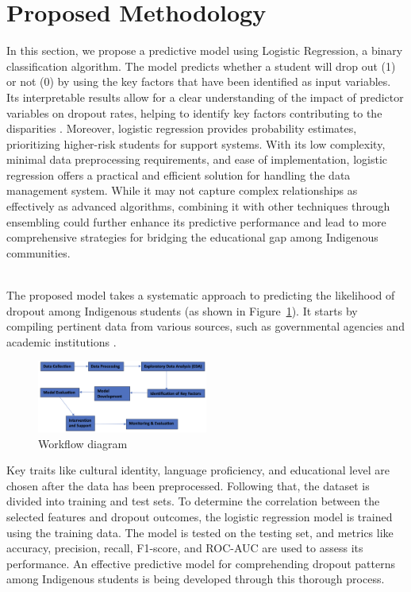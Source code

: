 \documentclass[final,12p,twocolumn]{article}
\begin{document}
\section{Proposed Methodology}
In this section, we propose a predictive model using Logistic Regression, a
binary classification algorithm. The model predicts whether a student will
drop out (1) or not (0) by using the key factors that have been identified
as input variables. Its interpretable results allow for a clear understanding of the impact of predictor variables on dropout rates, helping to identify key factors contributing to the disparities \cite{r13}. Moreover, logistic regression provides probability estimates, prioritizing higher-risk students for support systems. With its low complexity, minimal data preprocessing requirements, and ease of implementation, logistic regression offers a practical and efficient solution for handling the data management system. While it may not capture complex relationships as effectively as advanced algorithms, combining it with other techniques through ensembling could further enhance its predictive performance and lead to more comprehensive strategies for bridging the educational gap among Indigenous communities.

\\The proposed model takes a systematic approach to predicting the likelihood
of dropout among Indigenous students (as shown in Figure~\ref{fig:flowdiagram}). It starts by compiling pertinent
data from various sources, such as governmental agencies and academic
institutions \cite{r14}. 
\begin{figure}[H]
	\centering 
	\includegraphics[width=0.5\textwidth, angle=0]{images/FlowDiagram.png}	
	\caption{Workflow diagram} 
	\label{fig:flowdiagram}
\end{figure}
Key traits like cultural identity, language proficiency, and educational level are chosen after the data has been preprocessed. Following that, the dataset is divided into training and test sets. To determine the correlation between the selected features and dropout outcomes, the logistic regression model is trained using the training data. The model is tested on the testing set, and metrics like accuracy, precision, recall, F1-score, and ROC-AUC \cite{r15} are used to assess its performance. An effective predictive model for comprehending dropout patterns among Indigenous students is being developed through this thorough process.
\end{document}
